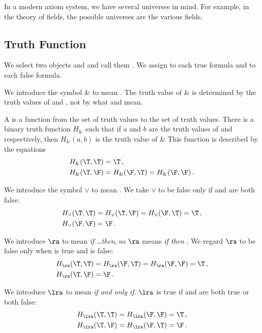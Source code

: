 In a modern axiom system, we have several universes in mind.
For example, in the theory of fields, the possible universes are the various fields.


\subsection{Truth Function}


We select two objects \T{} and \F{} and call them .
We assign \T{} to each true formula and \F{} to each false formula.

We introduce the symbol \& to mean .
The truth value of \A{} \& \B{} is determined by the truth values of \A{} and \B{}, not by what \A{} and \B{} mean.

A  is a function from the set of truth values to the set of truth values.
There is a binary truth function $H_\&$ such that if $a$ and $b$ are the truth values of \A{} and \B{} respectively, then $H_\&(a,b)$ is the truth value of \A{} \& \B{}
This function is described by the equations
\begin{align}
    H_\&(\T,\T) &= \T\,, \\
    H_\&(\T,\F) &= H_\&(\F,\T) = H_\&(\F,\F)\,.
\end{align}

We introduce the symbol $\vee$ to mean .
We take \A{} $\vee$ \B{} to be false only if \A{} and \B{} are both false:
\begin{align}
    H_\vee(\T,\T) &= H_\vee(\T,\F) = H_\vee(\F,\T) = \T\,, \\
    H_\vee(\F,\F) &= \F\,.
\end{align}

We introduce $\ra$ to mean \emph{if \dots then}, so \A{} $\ra$ \B{} means \emph{if \A{} then \B{}}.
We regard \A{} $\ra$ \B{} to be false only when \A{} is true and \B{} is false:
\begin{align}
    H_\ra(\T,\T) &= H_\ra(\F,\T) = H_\ra(\F,\F) = \T\,, \\
    H_\ra(\T,\F) &= \F\,.
\end{align}

We introduce $\lra$ to mean \emph{if and only if}. \A{} $\lra$ \B{} is true if \A{} and \B{} are both true or both false:
\begin{align}
    H_\lra(\T,\T) &= H_\lra(\F,\F) = \T\,, \\
    H_\lra(\T,\F) &= H_\lra(\F,\T) = \F\,.
\end{align}

